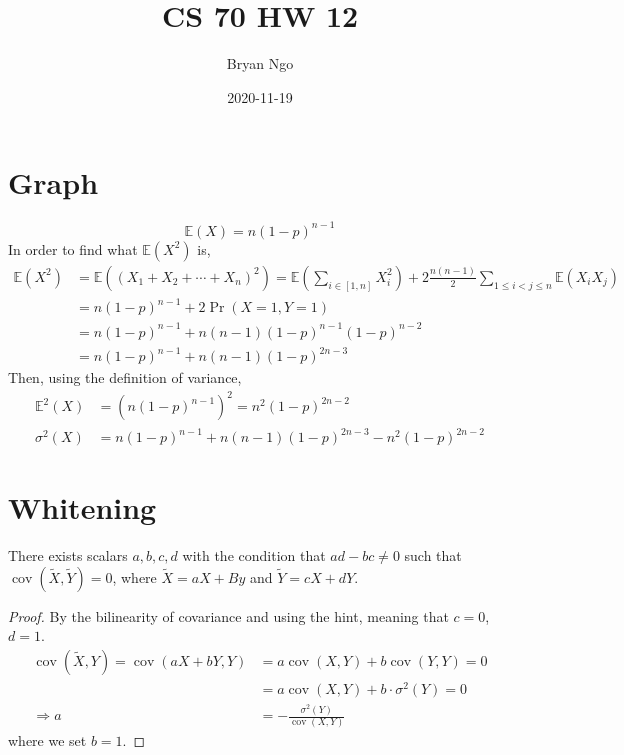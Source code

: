 \documentclass{article}
\title{CS 70 HW 12}
\author{Bryan Ngo}
\date{2020-11-19}
\newcommand{\E}{\mathbb{E}}
\newcommand{\cov}{\operatorname{cov}}
\begin{document}
\maketitle

\section{Graph}

\begin{equation}
    \E(X) = n (1 - p)^{n - 1}
\end{equation}
In order to find what \(\E(X^2)\) is,
\begin{align}
    \E(X^2) &= \E\left((X_1 + X_2 + \cdots + X_n)^2\right) = \E\left(\sum_{i \in [1, n]} X_i^2\right) + 2 \frac{n (n - 1)}{2} \sum_{1 \leqslant i < j \leqslant n} \E(X_i X_j) \\
    &= n (1 - p)^{n - 1} + 2 \Pr(X = 1, Y = 1) \\
    &= n (1 - p)^{n - 1} + n (n - 1) (1 - p)^{n - 1} (1 - p)^{n - 2} \\
    &= n (1 - p)^{n - 1} + n (n - 1) (1 - p)^{2n - 3}
\end{align}
Then, using the definition of variance,
\begin{align}
    \E^2(X) &= \left(n (1 - p)^{n - 1}\right)^2 = n^2 (1 - p)^{2n - 2} \\
    \sigma^2(X) &= n (1 - p)^{n - 1} + n (n - 1) (1 - p)^{2n - 3} - n^2 (1 - p)^{2n - 2}
\end{align}

\section{Whitening}
\begin{theorem}
    There exists scalars \(a, b, c, d\) with the condition that \(ad - bc \neq 0\) such that \(\cov(\widetilde{X}, \widetilde{Y}) = 0\), where \(\widetilde{X} = aX + By\) and \(\widetilde{Y} = cX + dY\).
\end{theorem}
\begin{proof}
    By the bilinearity of covariance and using the hint, meaning that \(c = 0\), \(d = 1\).
    \begin{align}
        \cov(\widetilde{X}, Y) = \cov(aX + bY, Y) &= a \cov(X, Y) + b \cov(Y, Y) = 0 \\
        &= a \cov(X, Y) + b \cdot \sigma^2(Y) = 0 \\
        \Rightarrow a &= -\frac{\sigma^2(Y)}{\cov(X, Y)}
    \end{align}
    where we set \(b = 1\).
\end{proof}
\end{document}
